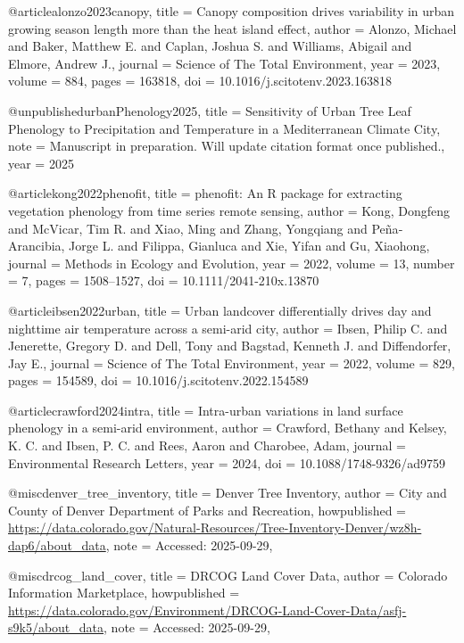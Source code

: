 @article{alonzo2023canopy,
  title   = {Canopy composition drives variability in urban growing season length more than the heat island effect},
  author  = {Alonzo, Michael and Baker, Matthew E. and Caplan, Joshua S. and Williams, Abigail and Elmore, Andrew J.},
  journal = {Science of The Total Environment},
  year    = {2023},
  volume  = {884},
  pages   = {163818},
  doi     = {10.1016/j.scitotenv.2023.163818}
}

@unpublished{urbanPhenology2025,
  title   = {Sensitivity of Urban Tree Leaf Phenology to Precipitation and Temperature in a Mediterranean Climate City},
  note    = {Manuscript in preparation. Will update citation format once published.},
  year    = {2025}
}

@article{kong2022phenofit,
  title   = {phenofit: An R package for extracting vegetation phenology from time series remote sensing},
  author  = {Kong, Dongfeng and McVicar, Tim R. and Xiao, Ming and Zhang, Yongqiang and Pe{\~n}a‐Arancibia, Jorge L. and Filippa, Gianluca and Xie, Yifan and Gu, Xiaohong},
  journal = {Methods in Ecology and Evolution},
  year    = {2022},
  volume  = {13},
  number  = {7},
  pages   = {1508--1527},
  doi     = {10.1111/2041-210x.13870}
}

@article{ibsen2022urban,
  title   = {Urban landcover differentially drives day and nighttime air temperature across a semi-arid city},
  author  = {Ibsen, Philip C. and Jenerette, Gregory D. and Dell, Tony and Bagstad, Kenneth J. and Diffendorfer, Jay E.},
  journal = {Science of The Total Environment},
  year    = {2022},
  volume  = {829},
  pages   = {154589},
  doi     = {10.1016/j.scitotenv.2022.154589}
}

@article{crawford2024intra,
  title   = {Intra-urban variations in land surface phenology in a semi-arid environment},
  author  = {Crawford, Bethany and Kelsey, K. C. and Ibsen, P. C. and Rees, Aaron and Charobee, Adam},
  journal = {Environmental Research Letters},
  year    = {2024},
  doi     = {10.1088/1748-9326/ad9759}
}

@misc{denver_tree_inventory,
  title        = {Denver Tree Inventory},
  author       = {{City and County of Denver Department of Parks and Recreation}},
  howpublished = {\url{https://data.colorado.gov/Natural-Resources/Tree-Inventory-Denver/wz8h-dap6/about_data}},
  note         = {Accessed: 2025-09-29},
}

@misc{drcog_land_cover,
  title        = {DRCOG Land Cover Data},
  author       = {{Colorado Information Marketplace}},
  howpublished = {\url{https://data.colorado.gov/Environment/DRCOG-Land-Cover-Data/asfj-s9k5/about_data}},
  note         = {Accessed: 2025-09-29},
}

